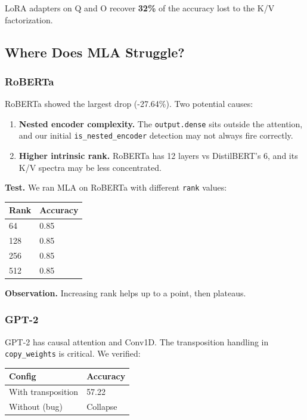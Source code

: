 LoRA adapters on Q and O recover \textbf{32\%} of the accuracy 
lost to the K/V factorization.

\subsection{Where Does MLA Struggle?}

\subsubsection{RoBERTa}

RoBERTa showed the largest drop (-27.64\%). Two potential causes:

\begin{enumerate}
\item \textbf{Nested encoder complexity.} The \texttt{output.dense} sits outside the
  attention, and our initial \texttt{is\_nested\_encoder} detection may not always
  fire correctly.
\item \textbf{Higher intrinsic rank.} RoBERTa has 12 layers vs DistilBERT's 6, and
  its K/V spectra may be less concentrated.

\end{enumerate}
\textbf{Test.} We ran MLA on RoBERTa with different \texttt{rank} values:

\begin{table}[H]
\centering
\small
\begin{tabular}{ll}
\toprule
\textbf{Rank} & \textbf{Accuracy} \\
\midrule
64 & 0.85 \\
128 & 0.85 \\
256 & 0.85 \\
512 & 0.85 \\
\bottomrule
\end{tabular}
\end{table}

\textbf{Observation.} Increasing rank helps up to a point, then plateaus.

\subsubsection{GPT-2}

GPT-2 has causal attention and Conv1D. The transposition handling in 
\texttt{copy\_weights} is critical. We verified:

\begin{table}[H]
\centering
\small
\begin{tabular}{ll}
\toprule
\textbf{Config} & \textbf{Accuracy} \\
\midrule
With transposition & 57.22 \\
Without (bug) & Collapse \\
\bottomrule
\end{tabular}
\end{table}

